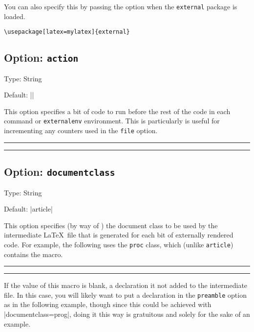\documentclass[10pt]{ltxdoc}
\newcommand{\env}[1]{\texttt{#1}}
\newcommand{\pkg}[1]{\texttt{#1}}
\newcommand{\opt}[1]{\texttt{#1}}
\def\sz{%
  \rule{0.2em}{7pt}%
  \llap{\rule[8pt]{0.2em}{2pt}}%
}
\begin{document}
You can also specify this by passing the option when the \pkg{external}
package is loaded.

\begin{tcolorbox}
\begin{verbatim}
\usepackage[latex=mylatex]{external}
\end{verbatim}
\end{tcolorbox}

\subsection{Option: \opt{action}}
\label{subsec:action}

Type: String

Default: ||

This option specifies a bit of code to run before the rest of the code
in each  command or \env{externalenv} environment.
This is particularly is useful for incrementing any counters used in
the \opt{file} option.

\begin{tcblisting}{}
%
\thefoo
\sz
\external[file=example-inline-action,action={\setcounter{foo}{100}}]{}%
\sz
\thefoo
\end{tcblisting}

\subsection{Option: \opt{documentclass}}
\label{subsec:documentclass}

Type: String

Default: |article|

This option specifies (by way of ) the document class
to be used by the intermediate \LaTeX\ file that is generated for each
bit of externally rendered code.
For example, the following uses the \pkg{proc} class, which (unlike
\pkg{article}) contains the  macro.

\begin{tcblisting}{}
\sz\external[documentclass=proc]{\pagename}\sz
\end{tcblisting}

If the value of this macro is blank, a  declaration
it not added to the intermediate file.
In this case, you will likely want to put a 
declaration in the \opt{preamble} option as in the following example,
though since this could be achieved with |documentclass=prog|, doing it
this way is gratuitous and solely for the sake of an example.
\end{document}
